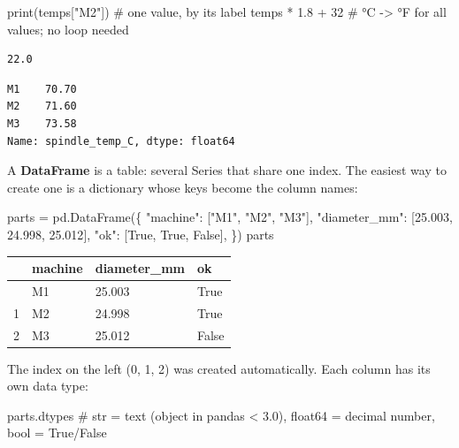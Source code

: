\documentclass[
  letterpaper,
  DIV=11,
  numbers=noendperiod]{scrreprt}
\newenvironment{Shaded}{\begin{snugshade}}{\end{snugshade}}
\newcommand{\BuiltInTok}[1]{\textcolor[rgb]{0.00,0.23,0.31}{#1}}
\newcommand{\CommentTok}[1]{\textcolor[rgb]{0.37,0.37,0.37}{#1}}
\newcommand{\DecValTok}[1]{\textcolor[rgb]{0.68,0.00,0.00}{#1}}
\newcommand{\FloatTok}[1]{\textcolor[rgb]{0.68,0.00,0.00}{#1}}
\newcommand{\NormalTok}[1]{\textcolor[rgb]{0.00,0.23,0.31}{#1}}
\newcommand{\OperatorTok}[1]{\textcolor[rgb]{0.37,0.37,0.37}{#1}}
\newcommand{\StringTok}[1]{\textcolor[rgb]{0.13,0.47,0.30}{#1}}
\newcommand{\VariableTok}[1]{\textcolor[rgb]{0.07,0.07,0.07}{#1}}
\begin{document}
\begin{Shaded}
\begin{Highlighting}[]
\BuiltInTok{print}\NormalTok{(temps[}\StringTok{"M2"}\NormalTok{])                 }\CommentTok{\# one value, by its label}
\NormalTok{temps }\OperatorTok{*} \FloatTok{1.8} \OperatorTok{+} \DecValTok{32}                   \CommentTok{\# °C {-}\textgreater{} °F for all values; no loop needed}
\end{Highlighting}
\end{Shaded}

\begin{verbatim}
22.0
\end{verbatim}

\begin{verbatim}
M1    70.70
M2    71.60
M3    73.58
Name: spindle_temp_C, dtype: float64
\end{verbatim}

A \textbf{DataFrame} is a table: several Series that share one index.
The easiest way to create one is a dictionary whose keys become the
column names:

\begin{Shaded}
\begin{Highlighting}[]
\NormalTok{parts }\OperatorTok{=}\NormalTok{ pd.DataFrame(\{}
    \StringTok{"machine"}\NormalTok{:     [}\StringTok{"M1"}\NormalTok{, }\StringTok{"M2"}\NormalTok{, }\StringTok{"M3"}\NormalTok{],}
    \StringTok{"diameter\_mm"}\NormalTok{: [}\FloatTok{25.003}\NormalTok{, }\FloatTok{24.998}\NormalTok{, }\FloatTok{25.012}\NormalTok{],}
    \StringTok{"ok"}\NormalTok{:          [}\VariableTok{True}\NormalTok{, }\VariableTok{True}\NormalTok{, }\VariableTok{False}\NormalTok{],}
\NormalTok{\})}
\NormalTok{parts}
\end{Highlighting}
\end{Shaded}

\begin{longtable}[]{@{}llll@{}}
\toprule\noalign{}
& machine & diameter\_mm & ok \\
\midrule\noalign{}
\endhead
\bottomrule\noalign{}
\endlastfoot
0 & M1 & 25.003 & True \\
1 & M2 & 24.998 & True \\
2 & M3 & 25.012 & False \\
\end{longtable}

The index on the left (0, 1, 2) was created automatically. Each column
has its own data type:

\begin{Shaded}
\begin{Highlighting}[]
\NormalTok{parts.dtypes          }\CommentTok{\# str = text (object in pandas \textless{} 3.0), float64 = decimal number, bool = True/False}
\end{Highlighting}
\end{Shaded}
\end{document}

